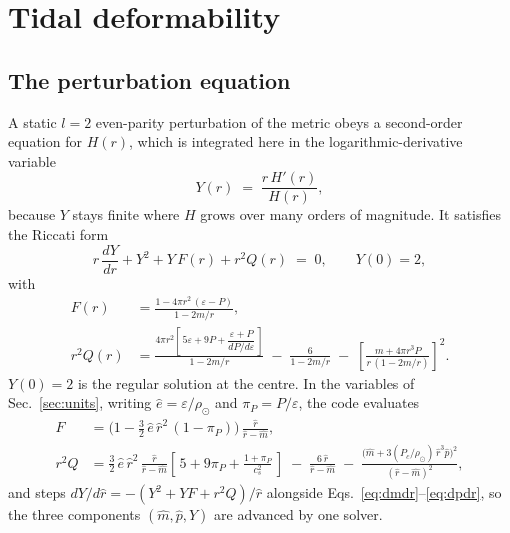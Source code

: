 \documentclass[aps,prc,onecolumn,superscriptaddress,nofootinbib,10pt]{revtex4-2}
\newcommand{\rhosol}{\rho_\odot}
\begin{document}
\section{Tidal deformability}
\label{sec:tidal}

\subsection{The perturbation equation}

A static $l = 2$ even-parity perturbation of the metric obeys a second-order
equation for $H(r)$, which is integrated here in the logarithmic-derivative
variable
%
\begin{equation}
Y(r) \;=\; \frac{r\,H'(r)}{H(r)} ,
\label{eq:Ydef}
\end{equation}
%
because $Y$ stays finite where $H$ grows over many orders of magnitude. It
satisfies the Riccati form~\cite{Hinderer2008,DamourNagar2009,Postnikov2010}
%
\begin{equation}
\boxed{\;
r\,\frac{dY}{dr} + Y^2 + Y\,F(r) + r^2 Q(r) \;=\; 0 , \qquad Y(0) = 2 , \;}
\label{eq:Y}
\end{equation}
%
with
%
\begin{align}
F(r) &= \frac{1 - 4\pi r^2\,(\varepsilon - P)}{1 - 2m/r} ,
\label{eq:F}\\[2pt]
r^2 Q(r) &= \frac{4\pi r^2\left[\,5\varepsilon + 9P
             + \dfrac{\varepsilon + P}{dP/d\varepsilon}\,\right]}{1 - 2m/r}
          \;-\; \frac{6}{1 - 2m/r}
          \;-\; \left[\frac{m + 4\pi r^3 P}{r\,(1 - 2m/r)}\right]^2 .
\label{eq:Q}
\end{align}
%
$Y(0) = 2$ is the regular solution at the centre. In the variables of
Sec.~\ref{sec:units}, writing $\hat e = \varepsilon/\rhosol$ and
$\pi_P = P/\varepsilon$, the code evaluates
%
\begin{align}
F &= \Big(1 - \tfrac{3}{2}\,\hat e\,\hat r^2\,(1 - \pi_P)\Big)\,
     \frac{\hat r}{\hat r - \hat m} ,
\label{eq:Fcode}\\[2pt]
r^2 Q &= \tfrac{3}{2}\,\hat e\,\hat r^2\,\frac{\hat r}{\hat r - \hat m}
         \left[\,5 + 9\pi_P + \frac{1 + \pi_P}{c_s^2}\,\right]
       \;-\; \frac{6\,\hat r}{\hat r - \hat m}
       \;-\; \frac{\big(\hat m + 3(P_c/\rhosol)\,\hat r^3 \hat p\big)^2}
                   {(\hat r - \hat m)^2} ,
\label{eq:Qcode}
\end{align}
%
and steps $d Y/d\hat r = -(Y^2 + Y F + r^2 Q)/\hat r$ alongside
Eqs.~\eqref{eq:dmdr}--\eqref{eq:dpdr}, so the three components
$(\hat m, \hat p, Y)$ are advanced by one solver.
\end{document}
